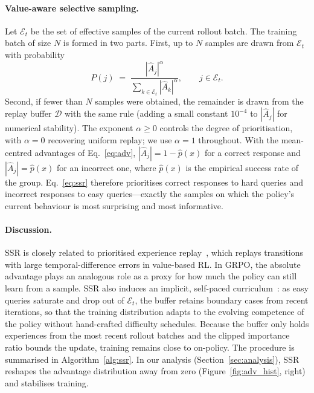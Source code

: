 \documentclass{article}
\begin{document}
\paragraph{Value-aware selective sampling.} Let $\mathcal{E}_t$ be the set of effective samples of the current rollout batch. The training batch of size $N$ is formed in two parts. First, up to $N$ samples are drawn from $\mathcal{E}_t$ with probability
\begin{equation}
P(j) \;=\; \frac{|\hat{A}_j|^{\alpha}}{\sum_{k\in\mathcal{E}_t}|\hat{A}_k|^{\alpha}}, \qquad j\in\mathcal{E}_t .
\label{eq:ssr}
\end{equation}
Second, if fewer than $N$ samples were obtained, the remainder is drawn from the replay buffer $\mathcal{D}$ with the same rule (adding a small constant $10^{-4}$ to $|\hat{A}_j|$ for numerical stability). The exponent $\alpha\geq 0$ controls the degree of prioritisation, with $\alpha=0$ recovering uniform replay; we use $\alpha=1$ throughout. With the mean-centred advantages of Eq.~\eqref{eq:adv}, $|\hat{A}_j|=1-\hat{p}(x)$ for a correct response and $|\hat{A}_j|=\hat{p}(x)$ for an incorrect one, where $\hat{p}(x)$ is the empirical success rate of the group. Eq.~\eqref{eq:ssr} therefore prioritises correct responses to hard queries and incorrect responses to easy queries---exactly the samples on which the policy's current behaviour is most surprising and most informative.

\paragraph{Discussion.} SSR is closely related to prioritised experience replay~\citep{per}, which replays transitions with large temporal-difference errors in value-based RL. In GRPO, the absolute advantage plays an analogous role as a proxy for how much the policy can still learn from a sample. SSR also induces an implicit, self-paced curriculum~\citep{curriculum}: as easy queries saturate and drop out of $\mathcal{E}_t$, the buffer retains boundary cases from recent iterations, so that the training distribution adapts to the evolving competence of the policy without hand-crafted difficulty schedules. Because the buffer only holds experiences from the most recent rollout batches and the clipped importance ratio bounds the update, training remains close to on-policy. The procedure is summarised in Algorithm~\ref{alg:ssr}. In our analysis (Section~\ref{sec:analysis}), SSR reshapes the advantage distribution away from zero (Figure~\ref{fig:adv_hist}, right) and stabilises training.
\end{document}
